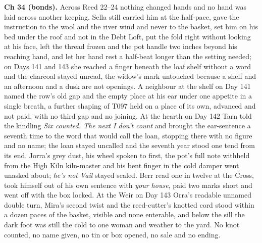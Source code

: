 \documentclass{design/chronicle}
\begin{document}
{\textbf{Ch 34 (bonds).} Across Reed 22–24 nothing changed hands and no hand was laid across another keeping. Sella still carried him at the half-pace, gave the instruction to the wool and the river wind and never to the basket, set him on his bed under the roof and not in the Debt Loft, put the fold right without looking at his face, left the thread frozen and the pot handle two inches beyond his reaching hand, and let her hand rest a half-beat longer than the setting needed; on Days 141 and 143 she reached a finger beneath the loaf shelf without a word and the charcoal stayed unread, the widow’s mark untouched because a shelf and an afternoon and a dusk are not openings. A neighbour at the shelf on Day 141 named the row’s old gap and the empty place at his ear under one appetite in a single breath, a further shaping of T097 held on a place of its own, advanced and not paid, with no third gap and no joining. At the hearth on Day 142 Tarn told the kindling \emph{Six counted. The next I don’t count} and brought the ear-sentence a seventh time to the word that would call the loan, stopping there with no figure and no name; the loan stayed uncalled and the seventh year stood one tend from its end. Jorra’s grey dust, his wheel spoken to first, the pot’s full note withheld from the High Kiln kiln-master and his bent finger in the cold damper went unasked about; \emph{he’s not Vail} stayed sealed. Berr read one in twelve at the Cross, took himself out of his own sentence with \emph{your house}, paid two marks short and went off with the box locked. At the Weir on Day 143 Orra’s readable unnamed double turn, Mira’s second twist and the reed-cutter’s knotted cord stood within a dozen paces of the basket, visible and none enterable, and below the sill the dark foot was still the cold to one woman and weather to the yard. No knot counted, no name given, no tin or box opened, no sale and no ending.

}
\end{document}
